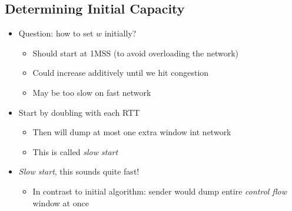 \subsection{Determining Initial Capacity}
\begin{itemize}[nosep]
    \item Question: how to set $w$ initially?
          \begin{itemize}[nosep]
              \item Should start at 1MSS (to avoid overloading the network)
              \item Could increase additively until we hit congestion
              \item May be too slow on fast network
          \end{itemize}
    \item Start by doubling with each RTT
          \begin{itemize}[nosep]
              \item Then will dump at most one extra window int network
              \item This is called \emph{slow start}
          \end{itemize}
    \item \emph{Slow start}, this sounds quite fast!
          \begin{itemize}[nosep]
              \item In contrast to initial algorithm: sender would dump entire \emph{control flow} window at once
          \end{itemize}
\end{itemize}